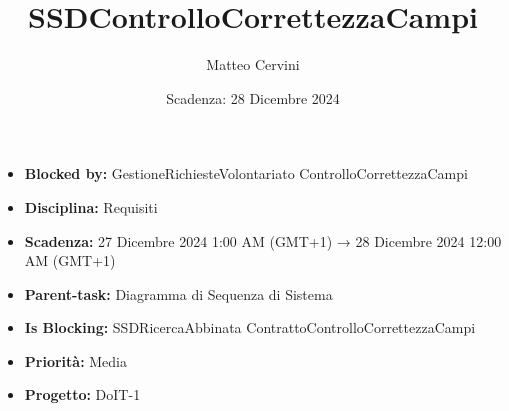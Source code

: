 \title{SSDControlloCorrettezzaCampi}
\author{Matteo Cervini}
\date{Scadenza: 28 Dicembre 2024}

\maketitle

\begin{itemize}
    \item \textbf{Blocked by:} GestioneRichiesteVolontariato ControlloCorrettezzaCampi
    \item \textbf{Disciplina:} Requisiti
    \item \textbf{Scadenza:} 27 Dicembre 2024 1:00 AM (GMT+1) → 28 Dicembre 2024 12:00 AM (GMT+1)
    \item \textbf{Parent-task:} Diagramma di Sequenza di Sistema
    \item \textbf{Is Blocking:} SSDRicercaAbbinata ContrattoControlloCorrettezzaCampi
    \item \textbf{Priorità:} Media
    \item \textbf{Progetto:} DoIT-1
\end{itemize}